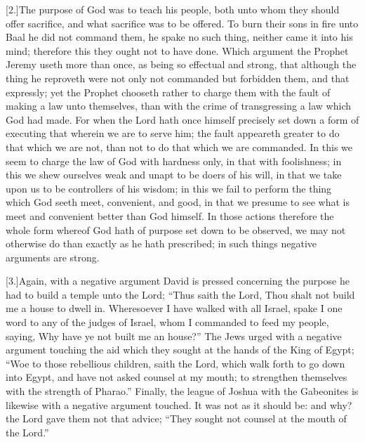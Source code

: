 [2.]The purpose of God was to teach his people, both unto whom they should offer sacrifice, and what sacrifice was to be offered. To burn their sons in fire unto Baal he did not command them, he spake no such thing, neither came it into his mind; therefore this they ought not to have done. Which argument the Prophet Jeremy useth more than once, as being so effectual and strong, that although the thing he reproveth were not only not commanded but forbidden them, and that expressly; yet the Prophet chooseth rather to charge them with the fault of making a law unto themselves, than with the crime of transgressing a law which God had made. For when the Lord hath once himself precisely set down a form of executing that wherein we are to serve him; the fault appeareth greater to do that which we are not, than not to do that which we are commanded. In this we seem to charge the law of God with hardness only, in that with foolishness; in this we shew ourselves weak and unapt to be doers of his will, in that we take upon us to be controllers of his wisdom; in this we fail to perform the thing which God seeth meet,  convenient, and good, in that we presume to see what is meet and convenient better than God himself. In those actions therefore the whole form whereof God hath of purpose set down to be observed, we may not otherwise do than exactly as he hath prescribed; in such things negative arguments are strong.

[3.]Again, with a negative argument David is pressed concerning the purpose he had to build a temple unto the Lord; “Thus saith the Lord, Thou shalt not build me a house to dwell in. Wheresoever I have walked with all Israel, spake I one word to any of the judges of Israel, whom I commanded to feed my people, saying, Why have ye not built me an house?” The Jews urged with a negative argument touching the aid which they sought at the hands of the King of Egypt; “Woe to those rebellious children, saith the Lord, which walk forth to go down into Egypt, and have not asked counsel at my mouth; to strengthen themselves with the strength of Pharao.” Finally, the league of Joshua with the Gabeonites is likewise with a negative argument touched. It was not as it should be: and why? the Lord gave them not that advice; “They sought not counsel at the mouth of the Lord.”

